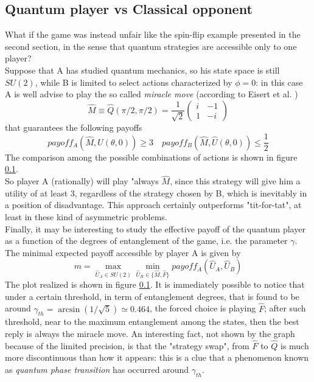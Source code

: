 \subsection{Quantum player vs Classical opponent}
What if the game was instead unfair like the spin-flip example presented in the second section, in the sense that quantum strategies are accessible only to one player?\\
Suppose that A has studied quantum mechanics, so his state space is still $SU(2)$, while B is limited to select actions characterized by $\phi=0$: in this case A is well advise to play the so called \textit{miracle move} (according to Eisert et al. \cite{Eisert_2020})
\[ \hat{M}\equiv\hat{Q}(\pi/2,\pi/2)=\frac{1}{\sqrt{2}}\begin{pmatrix} i&-1\\1&-i \end{pmatrix}  \]
that guarantees the following payoffs
\[ payoff_A\left(\hat{M},\hat{U}(\theta,0)\right) \geq 3 \quad payoff_B\left(\hat{M},\hat{U}(\theta,0)\right) \leq \frac{1}{2}  \]
The comparison among the possible combinations of actions is shown in figure \ref{}.\\
So player A (rationally) will play "always $\hat{M}$, since this strategy will give him a utility of at least 3, regardless of the strategy chosen by B, which is inevitably in a position of disadvantage. This approach certainly outperforms "tit-for-tat", at least in these kind of asymmetric problems.\\
Finally, it may be interesting to study the effective payoff of the quantum player as a function of the degrees of entanglement of the game, i.e. the parameter $\gamma$. The minimal expected payoff accessible by player A is given by
\[ m = \max_{\hat{U}_A\in SU(2)}\min_{\hat{U}_B\in\{\hat{M},\hat{F}\}} payoff_A\left(\hat{U}_A, \hat{U}_B\right) \]
The plot realized is shown in figure \ref{}. It is immediately possible to notice that under a certain threshold, in term of entanglement degrees, that is found to be around $\gamma_{th} = \arcsin\left(1/\sqrt{5}\right)\simeq 0.464$, the forced choice is playing $\hat{F}$; after such threshold, near to the maximum entanglement among the states, then the best reply is always the miracle move. An interesting fact, not shown by the graph because of the limited precision, is that the "strategy swap", from $\hat{F}$ to $\hat{Q}$ is much more discontinuous than how it appears: this is a clue that a phenomenon known as \textit{quantum phase transition} has occurred around $\gamma_{th}$.	






